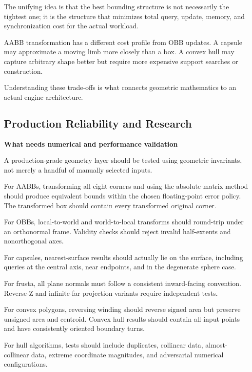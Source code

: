 The unifying idea is that the best bounding structure is not necessarily the tightest one; it is the structure that minimizes total query, update, memory, and synchronization cost for the actual workload.

AABB transformation has a different cost profile from OBB updates. A capsule may approximate a moving limb more closely than a box. A convex hull may capture arbitrary shape better but require more expensive support searches or construction.

Understanding these trade-offs is what connects geometric mathematics to an actual engine architecture.

\subsection{Production Reliability and Research}\label{04-visual-computing-ii-ch022-production-reliability-and-research}

\textbf{What needs numerical and performance validation}

A production-grade geometry layer should be tested using geometric invariants, not merely a handful of manually selected inputs.

For AABBs, transforming all eight corners and using the absolute-matrix method should produce equivalent bounds within the chosen floating-point error policy. The transformed box should contain every transformed original corner.

For OBBs, local-to-world and world-to-local transforms should round-trip under an orthonormal frame. Validity checks should reject invalid half-extents and nonorthogonal axes.

For capsules, nearest-surface results should actually lie on the surface, including queries at the central axis, near endpoints, and in the degenerate sphere case.

For frusta, all plane normals must follow a consistent inward-facing convention. Reverse-Z and infinite-far projection variants require independent tests.

For convex polygons, reversing winding should reverse signed area but preserve unsigned area and centroid. Convex hull results should contain all input points and have consistently oriented boundary turns.

For hull algorithms, tests should include duplicates, collinear data, almost-collinear data, extreme coordinate magnitudes, and adversarial numerical configurations.

